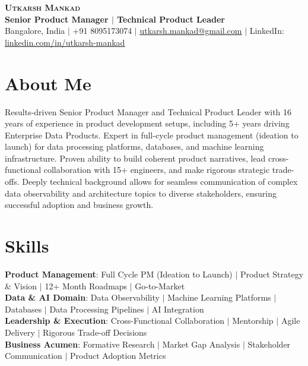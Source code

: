 \documentclass[letterpaper,11pt]{article}
\begin{document}
\begin{center}
    \textbf{\Huge \scshape Utkarsh Mankad} \\ \vspace{4pt} 
    \textbf{Senior Product Manager $|$ Technical Product Leader}\\ \vspace{4pt}
    \small
    Bangalore, India $|$ +91 8095173074 $|$ \href{mailto:utkarsh.mankad@gmail.com}{\underline{utkarsh.mankad@gmail.com}} $|$ LinkedIn: \href{https://www.linkedin.com/in/utkarsh-mankad}{\underline{linkedin.com/in/utkarsh-mankad}}
\end{center}

\section{About Me}
Results-driven Senior Product Manager and Technical Product Leader with 16 years of experience in product development setups, including 5+ years driving Enterprise Data Products. Expert in full-cycle product management (ideation to launch) for data processing platforms, databases, and machine learning infrastructure. Proven ability to build coherent product narratives, lead cross-functional collaboration with 15+ engineers, and make rigorous strategic trade-offs. Deeply technical background allows for seamless communication of complex data observability and architecture topics to diverse stakeholders, ensuring successful adoption and business growth.

\section{Skills}
 \begin{itemize}[leftmargin=0.15in, label={}]
    \small{\item{
     \textbf{Product Management}{: Full Cycle PM (Ideation to Launch) $|$ Product Strategy \& Vision $|$ 12+ Month Roadmaps $|$ Go-to-Market} \\ \vspace{3pt}
     \textbf{Data \& AI Domain}{: Data Observability $|$ Machine Learning Platforms $|$ Databases $|$ Data Processing Pipelines $|$ AI Integration} \\ \vspace{3pt}
     \textbf{Leadership \& Execution}{: Cross-Functional Collaboration $|$ Mentorship $|$ Agile Delivery $|$ Rigorous Trade-off Decisions} \\ \vspace{3pt}
     \textbf{Business Acumen}{: Formative Research $|$ Market Gap Analysis $|$ Stakeholder Communication $|$ Product Adoption Metrics}
    }}
 \end{itemize}
\end{document}
